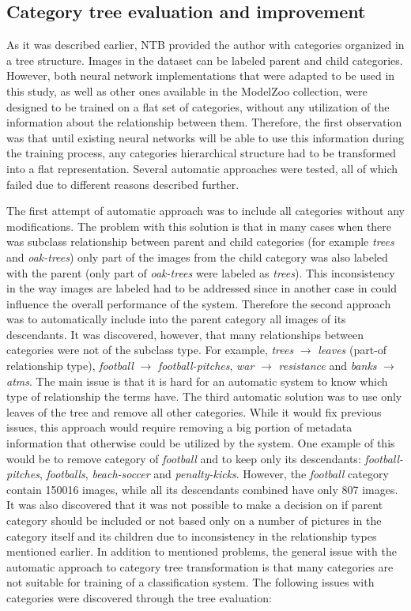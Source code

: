 \subsection{Category tree evaluation and improvement}
    \label{sec:tree-eval}
    As it was described earlier, NTB provided the author with categories organized in a tree structure. Images in the dataset can be labeled parent and child categories. However, both neural network implementations that were adapted to be used in this study, as well as other ones available in the ModelZoo \cite{CaffeModelZoo} collection, were designed to be trained on a flat set of categories, without any utilization of the information about the relationship between them. Therefore, the first observation was that until existing neural networks will be able to use this information during the training process, any categories hierarchical structure had to be transformed into a flat representation. Several automatic approaches were tested, all of which failed due to different reasons described further.
    
    The first attempt of automatic approach was to include all categories without any modifications. The problem with this solution is that in many cases when there was subclass relationship between parent and child categories (for example \textit{trees} and \textit{oak-trees}) only part of the images from the child category was also labeled with the parent (only part of \textit{oak-trees} were labeled as \textit{trees}). This inconsistency in the way images are labeled had to be addressed since in another case in could influence the overall performance of the system. Therefore the second approach was to automatically include into the parent category all images of its descendants. It was discovered, however, that many relationships between categories were not of the subclass type. For example, \textit{trees} $\rightarrow$ \textit{leaves} (part-of relationship type), \textit{football} $\rightarrow$ \textit{football-pitches}, \textit{war} $\rightarrow$ \textit{resistance} and \textit{banks} $\rightarrow$ \textit{atms}. The main issue is that it is hard for an automatic system to know which type of relationship the terms have. The third automatic solution was to use only leaves of the tree and remove all other categories. While it would fix previous issues, this approach would require removing a big portion of metadata information that otherwise could be utilized by the system. One example of this would be to remove category of \textit{football} and to keep only its descendants: \textit{football-pitches}, \textit{footballs}, \textit{beach-soccer} and \textit{penalty-kicks}. However, the \textit{football} category contain 150016 images, while all its descendants combined have only 807 images. It was also discovered that it was not possible to make a decision on if parent category should be included or not based only on a number of pictures in the category itself and its children due to inconsistency in the relationship types mentioned earlier. In addition to mentioned problems, the general issue with the automatic approach to category tree transformation is that many categories are not suitable for training of a classification system. The following issues with categories were discovered through the tree evaluation:
    
